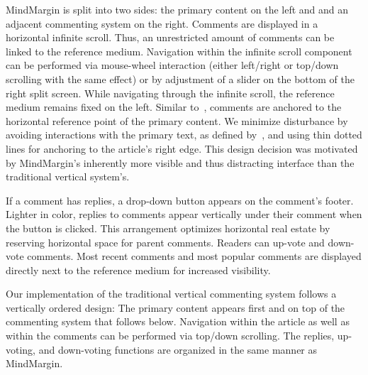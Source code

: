 MindMargin is split into two sides: the primary content on the left and and an adjacent commenting system on the right. Comments are displayed in a horizontal infinite scroll. Thus, an unrestricted amount of comments can be linked to the reference medium. Navigation within the infinite scroll component can be performed via mouse-wheel interaction (either left/right or top/down scrolling with the same effect) or by adjustment of a slider on the bottom of the right split screen. While navigating through the infinite scroll, the reference medium remains fixed on the left. Similar to~\cite{FluidDocs, NB}, comments are anchored to the horizontal reference point of the primary content. We minimize disturbance by avoiding interactions with the primary text, as defined by~\cite{FluidDocs}, and using thin dotted lines for anchoring to the article's right edge. This design decision was motivated by MindMargin's inherently more visible and thus distracting interface than the traditional vertical system's. 

If a comment has replies, a drop-down button appears on the comment's footer. Lighter in color, replies to comments appear vertically under their comment when the button is clicked. This arrangement optimizes horizontal real estate by reserving horizontal space for parent comments. Readers can up-vote and down-vote comments. Most recent comments and most popular comments are displayed directly next to the reference medium for increased visibility.
   
Our implementation of the traditional vertical commenting system follows a vertically ordered design: The primary content appears first and on top of the commenting system that follows below. Navigation within the article as well as within the comments can be performed via top/down scrolling. The replies, up-voting, and down-voting functions are organized in the same manner as MindMargin.